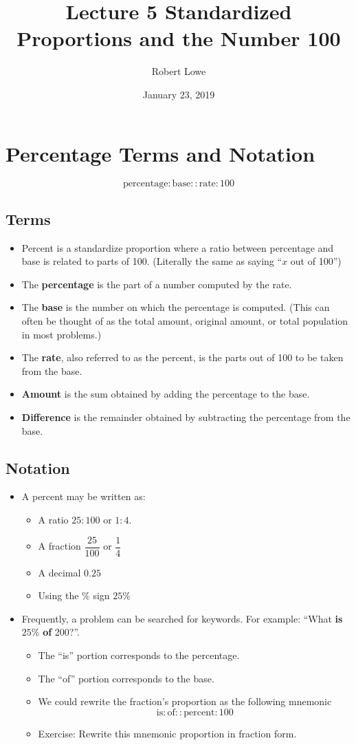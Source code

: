 \documentclass{article}
\title{Lecture 5  Standardized Proportions and the Number 100}
\author{Robert Lowe}
\date{January 23, 2019}
\begin{document}
\maketitle

\section*{Percentage Terms and Notation}
\[
\mathrm{percentage} : \mathrm{base} :: \mathrm{rate} : 100
\]
\subsection*{Terms}
\begin{itemize}
    \item Percent is a standardize proportion where a ratio between percentage and base is related to parts of 100. (Literally the same as saying ``$x$ out of 100'')
    \item The {\bf percentage} is the part of a number computed by the rate.
    \item The {\bf base} is the number on which the percentage is computed.  (This can often be thought of as the total amount, original amount, or total population in most problems.)
    \item The {\bf rate}, also referred to as the percent, is the parts out of 100 to be taken from the base. 
    \item {\bf Amount} is the sum obtained by adding the percentage to the base.
    \item {\bf Difference} is the remainder obtained by subtracting the percentage from the base.
\end{itemize}


\subsection*{Notation}
\begin{itemize}
\item A percent may be written as:
\begin{itemize}
  \item A ratio $25 : 100$ or $1:4$.
  \item A fraction $\dfrac{25}{100}$ or $\dfrac{1}{4}$
  \item A decimal $0.25$
  \item Using the $\%$ sign $25\%$
\end{itemize}
\item Frequently, a problem can be searched for keywords.  For example: ``What {\bf is} $25\%$ {\bf of} 200?''.
\begin{itemize}
  \item The ``is'' portion corresponds to the percentage.
  \item The ``of'' portion corresponds to the base.
  \item We could rewrite the fraction's proportion as the following mnemonic
  \[
  \mathrm{is} : \mathrm{of} :: \mathrm{percent} : 100
  \]
  \item Exercise: Rewrite this mnemonic proportion in fraction form.
\end{itemize}
\end{itemize}
\end{document}
